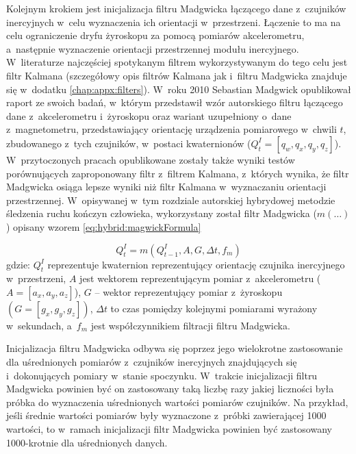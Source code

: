 Kolejnym krokiem jest inicjalizacja filtru Madgwicka łączącego dane z~czujników inercyjnych w~celu wyznaczenia ich orientacji w~przestrzeni. Łączenie to ma na celu ograniczenie dryfu żyroskopu za pomocą pomiarów akcelerometru, a~następnie wyznaczenie orientacji przestrzennej modułu inercyjnego. W~literaturze najczęściej spotykanym filtrem wykorzystywanym do tego celu jest filtr Kalmana \cite{Sasiadek2000, Sabatini2011, Mau2005, Qingming2014} (szczegółowy opis filtrów Kalmana jak i~filtru Madgwicka znajduje się w~dodatku \ref{chap:appx:filters}). W~roku 2010 Sebastian Madgwick opublikował raport ze swoich badań, w~którym przedstawił wzór autorskiego filtru łączącego dane z~akcelerometru i~żyroskopu oraz wariant uzupełniony o~dane z~magnetometru,  przedstawiający orientację urządzenia pomiarowego w~chwili $t$, zbudowanego z~tych czujników, w~postaci kwaternionów \cite{Madgwick2010, Madgwick2011} ($Q_t^I = \left[q_w, q_x, q_y, q_z\right]$). W~przytoczonych pracach opublikowane zostały także wyniki testów porównujących zaproponowany filtr z~filtrem Kalmana, z~których wynika, że filtr Madgwicka osiąga lepsze wyniki niż filtr Kalmana w~wyznaczaniu orientacji przestrzennej. W~opisywanej w~tym rozdziale autorskiej hybrydowej metodzie śledzenia ruchu kończyn człowieka, wykorzystany został filtr Madgwicka ($m(\ldots)$) opisany wzorem \ref{eq:hybrid:magwickFormula} 
		
\begin{equation}
	Q^I_t = m(Q^I_{t-1}, A, G, \Delta t, f_m) 
	\label{eq:hybrid:magwickFormula}
\end{equation}
gdzie: $Q^I_t$ reprezentuje kwaternion reprezentujący orientację czujnika inercyjnego w~przestrzeni, $A$ jest wektorem reprezentującym pomiar z~akcelerometru ($A =\left[a_x, a_y, a_z\right]$), $G$ -- wektor reprezentujący pomiar z~żyroskopu $(G = \left[g_x, g_y, g_z\right])$,	$\Delta t$ to czas pomiędzy kolejnymi pomiarami wyrażony w~sekundach, a~$f_m$ jest współczynnikiem filtracji filtru Madgwicka.
		
Inicjalizacja filtru Madgwicka odbywa się poprzez jego wielokrotne zastosowanie dla uśrednionych pomiarów z~czujników inercyjnych znajdujących się i~dokonujących pomiary w~stanie spoczynku. W~trakcie inicjalizacji filtru Madgwicka powinien być on zastosowany taką liczbę razy jakiej liczności była próbka do wyznaczenia uśrednionych wartości pomiarów czujników. Na przykład, jeśli średnie wartości pomiarów były wyznaczone z~próbki zawierającej 1000 wartości, to w~ramach inicjalizacji filtr Madgwicka powinien być zastosowany 1000-krotnie dla uśrednionych danych.\\
		
